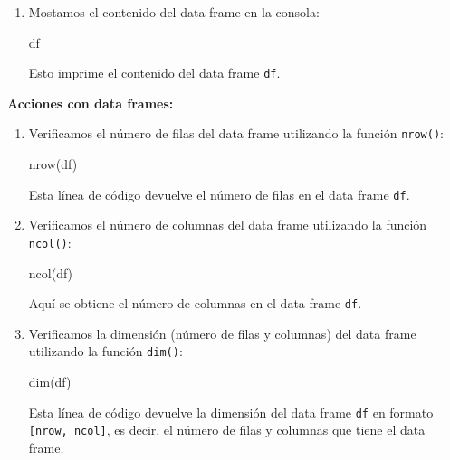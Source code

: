 \documentclass[
  jou,
  floatsintext,
  longtable,
  a4paper,
  nolmodern,
  notxfonts,
  notimes,
  12pt,
  colorlinks=true,linkcolor=blue,citecolor=blue,urlcolor=blue]{apa7}
\newenvironment{Shaded}{\begin{snugshade}}{\end{snugshade}}
\newcommand{\FunctionTok}[1]{\textcolor[rgb]{0.28,0.35,0.67}{#1}}
\newcommand{\NormalTok}[1]{\textcolor[rgb]{0.00,0.23,0.31}{#1}}
\newcommand{\OtherTok}[1]{\textcolor[rgb]{0.00,0.23,0.31}{#1}}
\begin{document}
\begin{enumerate}
\begin{Shaded}
\begin{Highlighting}[]
\NormalTok{df }\OtherTok{\textless{}{-}} \FunctionTok{data.frame}\NormalTok{(dbl, int, lgl, chr)}
\end{Highlighting}
\end{Shaded}

  El data frame \texttt{df} se crea utilizando los vectores
  \texttt{dbl}, \texttt{int}, \texttt{lgl} y \texttt{chr} como columnas.
\item
  Mostamos el contenido del data frame en la consola:

\begin{Shaded}
\begin{Highlighting}[]
\NormalTok{df}
\end{Highlighting}
\end{Shaded}

  Esto imprime el contenido del data frame \texttt{df}.
\end{enumerate}

\textbf{Acciones con data frames:}

\begin{enumerate}
\def\labelenumi{\arabic{enumi}.}
\item
  Verificamos el número de filas del data frame utilizando la función
  \texttt{nrow()}:

\begin{Shaded}
\begin{Highlighting}[]
\FunctionTok{nrow}\NormalTok{(df)}
\end{Highlighting}
\end{Shaded}

  Esta línea de código devuelve el número de filas en el data frame
  \texttt{df}.
\item
  Verificamos el número de columnas del data frame utilizando la función
  \texttt{ncol()}:

\begin{Shaded}
\begin{Highlighting}[]
\FunctionTok{ncol}\NormalTok{(df)}
\end{Highlighting}
\end{Shaded}

  Aquí se obtiene el número de columnas en el data frame \texttt{df}.
\item
  Verificamos la dimensión (número de filas y columnas) del data frame
  utilizando la función \texttt{dim()}:

\begin{Shaded}
\begin{Highlighting}[]
\FunctionTok{dim}\NormalTok{(df)}
\end{Highlighting}
\end{Shaded}

  Esta línea de código devuelve la dimensión del data frame \texttt{df}
  en formato \texttt{{[}nrow,\ ncol{]}}, es decir, el número de filas y
  columnas que tiene el data frame.
\end{enumerate}
\end{document}
